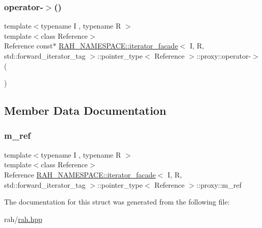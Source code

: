 \subsubsection{\texorpdfstring{operator-\/$>$()}{operator->()}}
{\footnotesize\ttfamily template$<$typename I , typename R $>$ \\
template$<$class Reference$>$ \\
Reference const$\ast$ \mbox{\hyperlink{struct_r_a_h___n_a_m_e_s_p_a_c_e_1_1iterator__facade}{R\+A\+H\+\_\+\+N\+A\+M\+E\+S\+P\+A\+C\+E\+::iterator\+\_\+facade}}$<$ I, R, std\+::forward\+\_\+iterator\+\_\+tag $>$\+::pointer\+\_\+type$<$ Reference $>$\+::proxy\+::operator-\/$>$ (\begin{DoxyParamCaption}{ }\end{DoxyParamCaption})\hspace{0.3cm}{\ttfamily [inline]}}



\subsection{Member Data Documentation}
\mbox{\label{struct_r_a_h___n_a_m_e_s_p_a_c_e_1_1iterator__facade_3_01_i_00_01_r_00_01std_1_1forward__iterato3fe5d6b1f3640cd0444b883f952b0798_a0bdb83fb57f5449a769a8b9e636fbefc}} 
\subsubsection{\texorpdfstring{m\_ref}{m\_ref}}
{\footnotesize\ttfamily template$<$typename I , typename R $>$ \\
template$<$class Reference$>$ \\
Reference \mbox{\hyperlink{struct_r_a_h___n_a_m_e_s_p_a_c_e_1_1iterator__facade}{R\+A\+H\+\_\+\+N\+A\+M\+E\+S\+P\+A\+C\+E\+::iterator\+\_\+facade}}$<$ I, R, std\+::forward\+\_\+iterator\+\_\+tag $>$\+::pointer\+\_\+type$<$ Reference $>$\+::proxy\+::m\+\_\+ref}



The documentation for this struct was generated from the following file\+:\begin{DoxyCompactItemize}
\item 
rah/\mbox{\hyperlink{rah_8hpp}{rah.\+hpp}}\end{DoxyCompactItemize}
